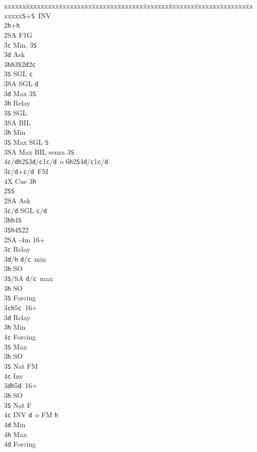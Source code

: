 \documentclass[a4paper,italian]{article}
\newcommand{\BS}{\small{\texttt{S}}}
\newcommand{\BC}{\small{\texttt{c}}}
\newcommand{\BD}{\small{\texttt{d}}}
\newcommand{\BH}{\small{\texttt{h}}}
\newenvironment{bidtable}
{\begin{tabbing}

    xxxxxx\=xxxxxxxxx\=xxxxxxxxx\=xxxxxxx\=xxxxxxx\=xxxxxxx\=xxxxxxx\=xxxxxxx\=xxxxxxx\=xxxxxxx\=\kill}
{\end{tabbing} }%
\begin{document}
\begin{multicols*}{2}
\begin{bidtable}
        3\BS {}+\BS\ INV\-\\
        2\BH {}+\BH \+\\
        2\small{SA} \> F1G\+\\
        3\BC \> Min, 3\BS\+\\
        3\BD \> Ask\+\\
        3\BH {}\BH3\BS2\BD2\BC\\
        3\BS \> SGL \BC\\
        3\small{SA} \> SGL \BD\-\-\\
        3\BD \> Max 3\BS\+\\
        3\BH \> Relay \+\\
        3\BS \> SGL\\
        3\small{SA} \> BIL\-\-\\
        3\BH \> Min\\
        3\BS \> Max SGL \BS \\
        3\small{SA} \> Max BIL senza 3\BS\\
        4\BC/\BD {}\BH2\BS3\BD/\BC1\BC/\BD\ o 6\BH2\BS4\BD/\BC1\BC/\BD\-\\
        3\BC/\BD {}+\BC /\BD\ FM\\
        4X \> Cue 3\BH \-\\
        2\BS {}\BS \+\\
        2\small{SA} \> Ask\+\\
        3\BC/\BD \> SGL \BC /\BD \\
        3\BH {}\BH 4\BS \\
        3\BS {}\BH 4\BS 22\-\-\\
        2\small{SA} -4m 16+\+\\
        3\BC \> Relay\+\\
        3\BD/\BH \> \BD /\BC\ min\+\\
        3\BH \> SO\-\\
        3\BS/SA \> \BD /\BC\ max\-\\
        3\BH \> SO\\
        3\BS \> Forcing\-\\
        3\BC {}\BH 5\BC\ 16+\+\\
        3\BD \> Relay\+\\
        3\BH \> Min\+\\
        4\BC \> Forcing\-\\
        3\BS \> Max\-\\
        3\BH \> SO\\
        3\BS \> Nat FM\\
        4\BC \> Inv\-\\
        3\BD {}\BH 5\BD\ 16+\+\\
        3\BH \> SO\\
        3\BS \> Nat F\\
        4\BC \> INV \BD\ o FM \BH \+\\
        4\BD \> Min\\
        4\BH \> Max\-\\
        4\BD \> Forcing\-\-
    \end{bidtable}


\end{multicols*}
\end{document}
